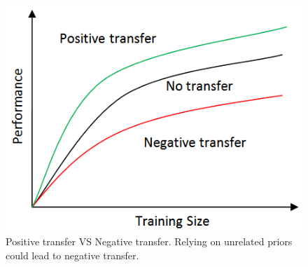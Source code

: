 \begin{figure}
\centering
\includegraphics[scale=.6]{fig/negative.png}
\caption{Positive transfer VS Negative transfer. Relying on unrelated priors could lead to negative transfer.}\label{fig:neg}
\end{figure}

